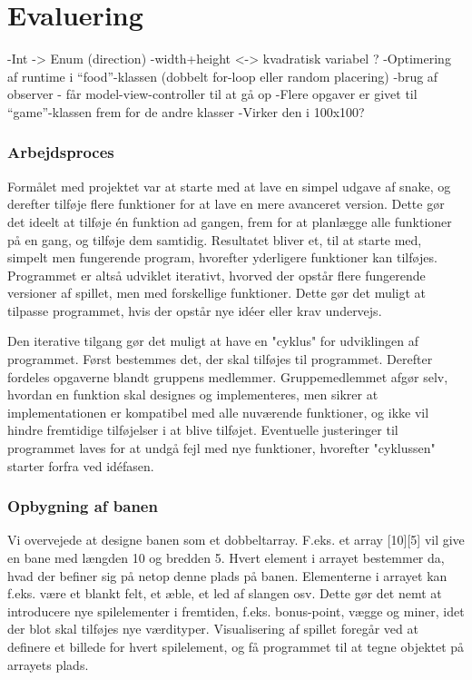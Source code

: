 \section{Evaluering}
-Int -> Enum (direction)
-width+height <-> kvadratisk variabel ?
-Optimering af runtime i “food”-klassen (dobbelt for-loop eller random placering)
-brug af observer - får model-view-controller til at gå op
-Flere opgaver er givet til “game”-klassen frem for de andre klasser
-Virker den i 100x100?
 
\subsubsection{Arbejdsproces}
Formålet med projektet var at starte med at lave en simpel udgave af snake, og derefter tilføje flere funktioner for at lave en mere avanceret version. Dette gør det ideelt at tilføje én funktion ad gangen, frem for at planlægge alle funktioner på en gang, og tilføje dem samtidig. Resultatet bliver et, til at starte med, simpelt men fungerende program, hvorefter yderligere funktioner kan tilføjes. Programmet er altså udviklet iterativt, hvorved der opstår flere fungerende versioner af spillet, men med forskellige funktioner. Dette gør det muligt at tilpasse programmet, hvis der opstår nye idéer eller krav undervejs. 
 
Den iterative tilgang gør det muligt at have en "cyklus" for udviklingen af programmet. Først bestemmes det, der skal tilføjes til programmet. Derefter fordeles opgaverne blandt gruppens medlemmer. Gruppemedlemmet afgør selv, hvordan en funktion skal designes og implementeres, men sikrer at implementationen er kompatibel med alle nuværende funktioner, og ikke vil hindre fremtidige tilføjelser i at blive tilføjet. Eventuelle justeringer til programmet laves for at undgå fejl med nye funktioner, hvorefter "cyklussen" starter forfra ved idéfasen.

\subsubsection{Opbygning af banen}
Vi overvejede at designe banen som et dobbeltarray. F.eks. et array [10][5] vil give en bane med længden 10 og bredden 5. Hvert element i arrayet bestemmer da, hvad der befiner sig på netop denne plads på banen. Elementerne i arrayet kan f.eks. være et blankt felt, et æble, et led af slangen osv. Dette gør det nemt at introducere nye spilelementer i fremtiden, f.eks. bonus-point, vægge og miner, idet der blot skal tilføjes nye værdityper. Visualisering af spillet foregår ved at definere et billede for hvert spilelement, og få programmet til at tegne objektet på arrayets plads.


